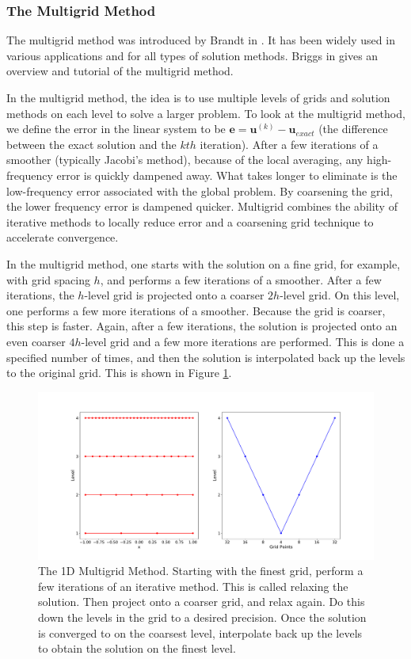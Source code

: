 \subsubsection{The Multigrid Method}
\label{subsub:multigrid-method}

The multigrid method was introduced by Brandt in \cite{brandt1977multi}. It has been widely used in various applications and for all types of solution methods. Briggs in \cite{briggs2000multigrid} gives an overview and tutorial of the multigrid method.

In the multigrid method, the idea is to use multiple levels of grids and solution methods on each level to solve a larger problem. To look at the multigrid method, we define the error in the linear system to be $\textbf{e} = \textbf{u}^{(k)} - \textbf{u}_{exact}$ (the difference between the exact solution and the $kth$ iteration). After a few iterations of a smoother (typically Jacobi's method), because of the local averaging, any high-frequency error is quickly dampened away. What takes longer to eliminate is the low-frequency error associated with the global problem. By coarsening the grid, the lower frequency error is dampened quicker. Multigrid combines the ability of iterative methods to locally reduce error and a coarsening grid technique to accelerate convergence.

In the multigrid method, one starts with the solution on a fine grid, for example, with grid spacing $h$, and performs a few iterations of a smoother. After a few iterations, the $h$-level grid is projected onto a coarser $2h$-level grid. On this level, one performs a few more iterations of a smoother. Because the grid is coarser, this step is faster. Again, after a few iterations, the solution is projected onto an even coarser $4h$-level grid and a few more iterations are performed. This is done a specified number of times, and then the solution is interpolated back up the levels to the original grid. This is shown in Figure \ref{fig:multigrid}.

\begin{figure}
    \centering
    \includegraphics[width=0.8\columnwidth]{figures/multigrid.pdf}
    \caption{The 1D Multigrid Method. Starting with the finest grid, perform a few iterations of an iterative method. This is called relaxing the solution. Then project onto a coarser grid, and relax again. Do this down the levels in the grid to a desired precision. Once the solution is converged to on the coarsest level, interpolate back up the levels to obtain the solution on the finest level.}
    \label{fig:multigrid}
\end{figure}


